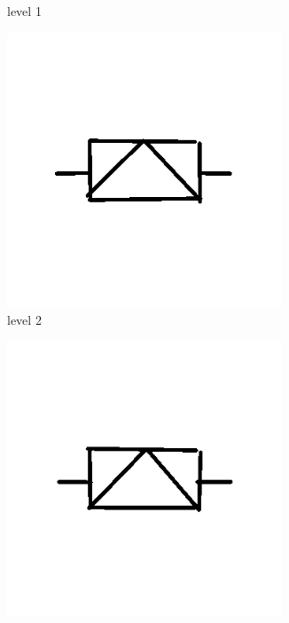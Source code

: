 \begin{figure}[h]
\begin{subfigure}[b]{0.25\textwidth}
                \caption{level 1}
        \end{subfigure}
                \begin{subfigure}[b]{0.25\textwidth}
                \centering
                \includegraphics[width=0.9\textwidth]{figures/Results/Sketches100f/level2.png}
                \caption{level 2}
        \end{subfigure}
                \begin{subfigure}[b]{0.25\textwidth}
                \centering
                \includegraphics[width=0.9\textwidth]{figures/Results/Sketches100f/level3.png}

\end{subfigure}
\end{figure}
